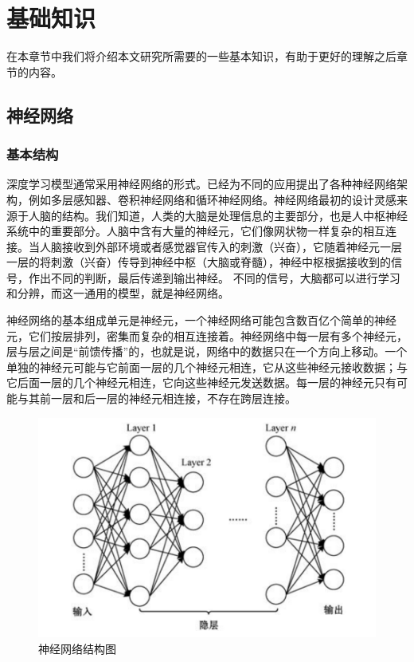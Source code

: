 \chapter{基础知识}
\label{ch2}
在本章节中我们将介绍本文研究所需要的一些基本知识，有助于更好的理解之后章节的内容。

\section{神经网络}
\subsection{基本结构}
深度学习模型通常采用神经网络的形式。已经为不同的应用提出了各种神经网络架构，例如多层感知器、卷积神经网络和循环神经网络。神经网络最初的设计灵感来源于人脑的结构。我们知道，人类的大脑是处理信息的主要部分，也是人中枢神经系统中的重要部分。人脑中含有大量的神经元，它们像网状物一样复杂的相互连接。当人脑接收到外部环境或者感觉器官传入的刺激（兴奋），它随着神经元一层一层的将刺激（兴奋）传导到神经中枢（大脑或脊髓），神经中枢根据接收到的信号，作出不同的判断，最后传递到输出神经。
不同的信号，大脑都可以进行学习和分辨，而这一通用的模型，就是神经网络。

神经网络的基本组成单元是神经元，一个神经网络可能包含数百亿个简单的神经元，它们按层排列，密集而复杂的相互连接着。神经网络中每一层有多个神经元，层与层之间是“前馈传播”的，也就是说，网络中的数据只在一个方向上移动。一个单独的神经元可能与它前面一层的几个神经元相连，它从这些神经元接收数据；与它后面一层的几个神经元相连，它向这些神经元发送数据。每一层的神经元只有可能与其前一层和后一层的神经元相连接，不存在跨层连接。

\begin{figure}[!hbt]
\centering
	\includegraphics[scale=0.5]{fig2/C2/深度神经网络结构图}%
	\caption{神经网络结构图}
	\label{fig:神经网络结构图}	
\end{figure}

